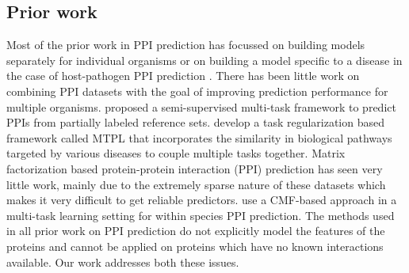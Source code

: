 \documentclass{bioinfo}
\begin{document}
\subsection{Prior work}
Most of the prior work in PPI prediction has focussed on building models separately for individual 
organisms \citep{chen,yeast,struct2net,qi06} or on building a model specific to a disease in the case of host-pathogen PPI 
prediction \citep{tastan09,qi09,dyer07,me12}. There has been little work on combining PPI datasets with the goal of improving 
prediction performance for multiple organisms. \cite{qi2010} proposed a semi-supervised multi-task framework to predict PPIs from partially labeled reference sets. \cite{me_ismb_2013} develop a task regularization based
framework called MTPL that incorporates the similarity in biological pathways targeted by various diseases to 
couple multiple tasks together. Matrix factorization based protein-protein interaction (PPI) prediction has seen very little work, mainly due to the extremely sparse nature of these datasets which makes it very difficult to get reliable predictors. \cite{ppi_cmf} use a CMF-based approach in a multi-task learning setting for within species PPI prediction. The methods used 
in all prior work on PPI prediction do not explicitly model the features of the proteins and cannot be applied on proteins which have no known interactions available. Our work addresses both these issues.
\end{document}
